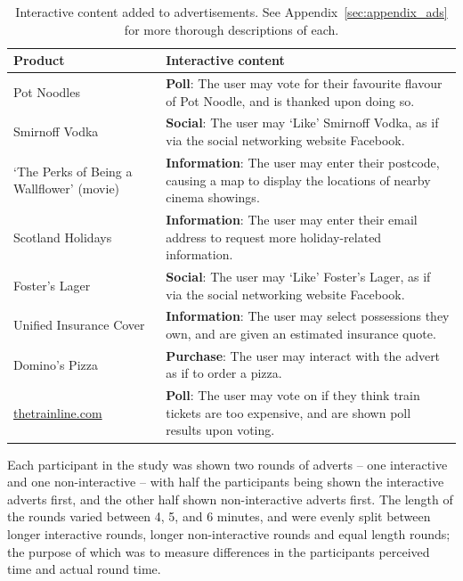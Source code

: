 	\begin{table}[hb]
		\centering
		\begin{tabularx}{\linewidth}{ >{\centering}X X }
			\toprule
			\bf Product & \bf Interactive content \\
			\midrule
			Pot Noodles & \textbf{Poll}: The user may vote for their favourite flavour of Pot Noodle, and is thanked upon doing so. \\
			Smirnoff Vodka & \textbf{Social}: The user may `Like' Smirnoff Vodka, as if via the social networking website Facebook. \\
			`The Perks of Being a Wallflower' (movie) & \textbf{Information}: The user may enter their postcode, causing a map to display the locations of nearby cinema showings. \\
			Scotland Holidays & \textbf{Information}: The user may enter their email address to request more holiday-related information. \\
			Foster's Lager & \textbf{Social}: The user may `Like' Foster's Lager, as if via the social networking website Facebook. \\
			Unified Insurance Cover & \textbf{Information}: The user may select \newline possessions they own, and are given an estimated insurance quote. \\
			Domino's Pizza & \textbf{Purchase}: The user may interact with the advert as if to order a pizza. \\
			\url{thetrainline.com} & \textbf{Poll}: The user may vote on if they think train tickets are too expensive, and are shown poll results upon voting. \\
			\bottomrule
		\end{tabularx}
		\caption{Interactive content added to advertisements. See Appendix~\ref{sec:appendix_ads} for more thorough descriptions of each.}
		\label{tab:interactive_content}
	\end{table}

	Each participant in the study was shown two rounds of adverts -- one interactive and one non-interactive -- with half the participants being shown the interactive adverts first, and the other half shown non-interactive adverts first. The length of the rounds varied between 4, 5, and 6 minutes, and were evenly split between longer interactive rounds, longer non-interactive rounds and equal length rounds; the purpose of which was to measure differences in the participants perceived time and actual round time. 


